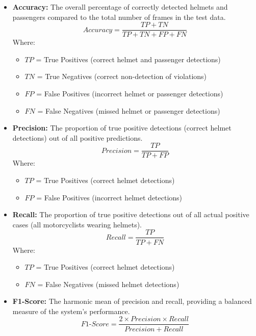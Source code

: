 \begin{refsection}
\begin{itemize}
    \item \textbf{Accuracy:} The overall percentage of correctly detected helmets and passengers compared to the total number of frames in the test data.
    \begin{equation}
        Accuracy = \frac{TP + TN}{TP + TN + FP + FN}
        \label{eq:accuracy}
    \end{equation}
    Where:
    \begin{itemize}
        \item $TP$ = True Positives (correct helmet and passenger detections)
        \item $TN$ = True Negatives (correct non-detection of violations)
        \item $FP$ = False Positives (incorrect helmet or passenger detections)
        \item $FN$ = False Negatives (missed helmet or passenger detections)
    \end{itemize}

    \item \textbf{Precision:} The proportion of true positive detections (correct helmet detections) out of all positive predictions.
    \begin{equation}
        Precision = \frac{TP}{TP + FP}
        \label{eq:precision}
    \end{equation}
    Where:
    \begin{itemize}
        \item $TP$ = True Positives (correct helmet detections)
        \item $FP$ = False Positives (incorrect helmet detections)
    \end{itemize}

    \item \textbf{Recall:} The proportion of true positive detections out of all actual positive cases (all motorcyclists wearing helmets).
    \begin{equation}
        Recall = \frac{TP}{TP + FN}
        \label{eq:recall}
    \end{equation}
    Where:
    \begin{itemize}
        \item $TP$ = True Positives (correct helmet detections)
        \item $FN$ = False Negatives (missed helmet detections)
    \end{itemize}

    \item \textbf{F1-Score:} The harmonic mean of precision and recall, providing a balanced measure of the system’s performance.
    \begin{equation}
        F1\text{-}Score = \frac{2 \times Precision \times Recall}{Precision + Recall}
        \label{eq:f1score}
    \end{equation}
\end{itemize}


\end{refsection}
